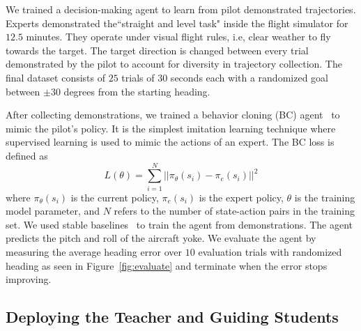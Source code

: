 \documentclass[letterpaper]{article} %
\begin{document}
We trained a decision-making agent to learn from pilot demonstrated trajectories. Experts demonstrated the``straight and level task" inside the flight simulator for $12.5$ minutes. They operate under visual flight rules, i.e, clear weather to fly towards the target. The target direction is changed between every trial demonstrated by the pilot to account for diversity in trajectory collection. The final dataset consists of $25$ trials of $30$ seconds each with a randomized goal between $\pm 30$ degrees from the starting heading.

After collecting demonstrations, we trained a behavior cloning (BC) agent~\cite{pomerleau1988alvinn} to mimic the pilot's policy. It is the simplest imitation learning technique where supervised learning is used to mimic the actions of an expert. The BC loss is defined as
\begin{equation}
   L(\theta)=\sum_{i=1}^{N}||\pi_{\theta}(s_i)-\pi_e(s_i)||^2
   \label{bc_loss}
\end{equation}
where $\pi_{\theta}(s_i)$ is the current policy, $\pi_e(s_i)$ is the expert policy, $\theta$ is the training model parameter, and $N$ refers to the number of state-action pairs in the training set. We used stable baselines~\cite{stable-baselines3} to train the agent from demonstrations. The agent predicts the pitch and roll of the aircraft yoke. We evaluate the agent by measuring the average heading error over $10$ evaluation trials with randomized heading as seen in Figure~\ref{fig:evaluate} and terminate when the error stops improving.



\subsection{Deploying the Teacher and Guiding Students}
\end{document}
